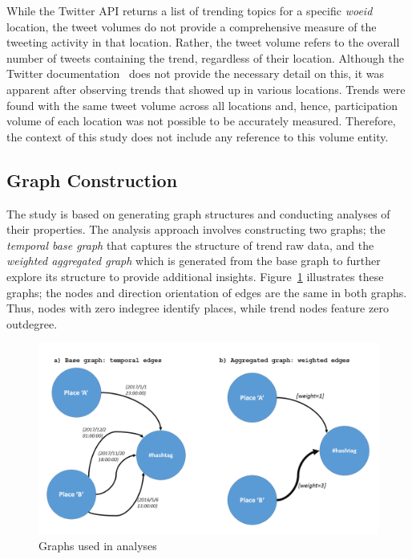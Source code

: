 \documentclass{llncs}
\begin{document}
While the Twitter API returns a list of trending topics for a specific
{\emph{woeid}} location, the tweet volumes do not provide a
comprehensive measure of the tweeting activity in that
location. Rather, the tweet volume refers to the overall number of
tweets containing the trend, regardless of their location. Although
the Twitter documentation~\cite{twittertrends} does not provide the
necessary detail on this, it was apparent after observing trends that
showed up in various locations. Trends were found with the same tweet
volume across all locations and, hence, participation volume of each
location was not possible to be accurately measured. Therefore, the
context of this study does not include any reference to this volume
entity.

\subsection{Graph Construction}

The study is based on generating graph structures and conducting
analyses of their properties. The analysis approach involves
constructing two graphs; the {\emph{temporal base graph}} that
captures the structure of trend raw data, and the {\emph{weighted
aggregated graph}} which is generated from the base graph to further
explore its structure to provide additional
insights. Figure~\ref{fig:graphexamples} illustrates these graphs; the
nodes and direction orientation of edges are the same in both
graphs. Thus, nodes with zero indegree identify places, while trend
nodes feature zero outdegree.

\begin{figure}[htb] \centering
\includegraphics[width=\columnwidth]{images/graphexamples.png}
\caption{Graphs used in analyses}
\label{fig:graphexamples}
\end{figure}
\end{document}
